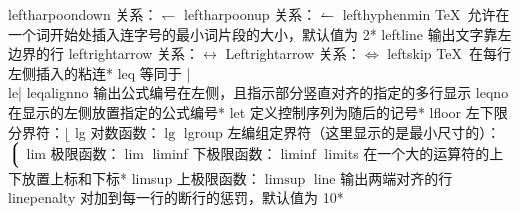 \capcs leftharpoondown {关系：$\leftharpoondown$}{}{}
\capcs leftharpoonup {关系：$\leftharpoonup$}{}{}
\capcs lefthyphenmin {\TeX\ 允许在一个词开始处插入连字号的最小词片段的大小，默认值为 2}*{}
\capcs leftline {输出文字靠左边界的行}{}{}
\capcs leftrightarrow {关系：$\leftrightarrow$}{}{}
\capcs Leftrightarrow {关系：$\Leftrightarrow$}{}{}
\capcs leftskip {\TeX\ 在每行左侧插入的粘连}*{}
\capcs leq {等同于 |\\le|}{}{}
\capcs leqalignno {输出公式编号在左侧，且指示部分竖直对齐的指定的多行显示}{}{}
\capcs leqno {在显示的左侧放置指定的公式编号}*{}
\capcs let {定义控制序列为随后的记号}*{}
\capcs lfloor {左下限分界符：$\lfloor$}{}{}
\capcs lg {对数函数：$\lg$}{}{}
\capcs lgroup {左编组定界符（这里显示的是最小尺寸的）：$\Big\lgroup$}{}{}
\capcs lim {极限函数：$\lim$}{}{}
\capcs liminf {下极限函数：$\liminf$}{}{}
\capcs limits {在一个大的运算符的上下放置上标和下标}*{}
\capcs limsup {上极限函数：$\limsup$}{}{}
\capcs line {输出两端对齐的行}{}{}
\capcs linepenalty {对加到每一行的断行的惩罚，默认值为 10}*{}
